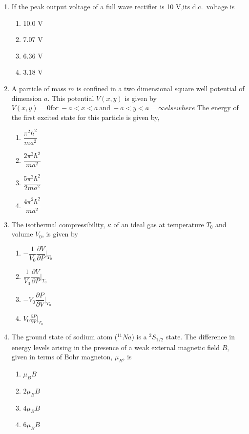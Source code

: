 \documentclass[journal,12pt,onecolumn]{IEEEtran}
\theoremstyle{remark}
\begin{document}
\begin{enumerate}
\item If the peak output voltage of a full wave rectifier is 10 V,its d.c.\ voltage is
\begin{multicols}{2}
\begin{enumerate}
\item 10.0 V 
\item 7.07 V
\item 6.36 V 
\item 3.18 V

\end{enumerate}
\end{multicols}


\item A particle of mass $m$ is confined in a two dimensional square well potential of dimension $a$. This potential $V(x,y)$ is given by
$
V(x,y)=0  \text   {for} \  -a < x < a \ \text{and} \ -a < y < a
= \infty  elsewhere
$
The energy of the first excited state for this particle is given by,
\begin{multicols}{4}
\begin{enumerate}
\item $\dfrac{\pi^{2}\hbar^{2}}{ma^{2}}$
\item $\dfrac{2\pi^{2}\hbar^{2}}{ma^{2}}$
\item $\dfrac{5\pi^{2}\hbar^{2}}{2ma^{2}}$
\item $\dfrac{4\pi^{2}\hbar^{2}}{ma^{2}}$
\end{enumerate}
\end{multicols}

\item The isothermal compressibility, $\kappa$ of an ideal gas at temperature $T_{0}$ and volume $V_{0}$, is given by
\begin{multicols}{4}
\begin{enumerate}
\item $-\dfrac{1}{V_{0}}  \dfrac{\partial V}{\partial P} |_{T_{0}}$
\item $\dfrac{1}{V_{0}}  \dfrac{\partial V}{\partial P} |_{T_{0}}$
\item $-V_{0}  \dfrac{\partial P}{\partial V} |_{T_{0}}$
\item $V_{0}  \tfrac{\partial P}{\partial V}|_{T_{0}}$
\end{enumerate}
\end{multicols}

\item The ground state of sodium atom ($^{11}Na$) is a $^{2}S_{1/2}$ state. The difference in energy levels arising in the presence of a weak external magnetic field $B$, given in terms of Bohr magneton, $\mu_{B}$, is
\begin{multicols}{4}
\begin{enumerate}
\item $\mu_{B}B$
\item $2\mu_{B}B$
\item $4\mu_{B}B$
\item $6\mu_{B}B$
\end{enumerate}
\end{multicols}


\end{enumerate}
\end{document}
